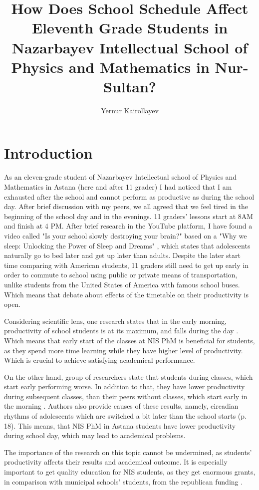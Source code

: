 \documentclass[12pt,a4paper,stu, donotrepeattitle, floatsintext]{apa7}
\title{\large{How Does School Schedule Affect Eleventh Grade Students in Nazarbayev Intellectual School of Physics and Mathematics in Nur-Sultan?}}
\author{Yernur Kairollayev}
\affiliation{Nazarbayev Intellectual School of Physics and Mathematics}
\begin{document}
\maketitle
\section{Introduction}
As an eleven-grade student of Nazarbayev Intellectual school of Physics and Mathematics in Astana (here and after 11 grader) I had noticed that I am exhausted after the school and cannot perform as productive as during the school day. After brief discussion with my peers, we all agreed that we feel tired in the beginning of the school day and in the evenings. 11 graders’ lessons start at 8AM and finish at 4 PM. After brief research in the YouTube platform, I have found a video called "Is your school slowly destroying your brain?" \cite{youtube} based on a "Why we sleep: Unlocking the Power of Sleep and Dreams" \cite{Walker2017}, which states that adolescents naturally go to bed later and get up later than adults. Despite the later start time comparing with American students, 11 graders still need to get up early in order to commute to school using public or private means of transportation, unlike students from the United States of America with famous school buses. Which means that debate about effects of the timetable on their productivity is open.

Considering scientific lens, one research states that in the early morning, productivity of school students is at its maximum, and falls during the day \cite[p. 10]{Pope2016}. Which means that early start of the classes at NIS PhM is beneficial for students, as they spend more time learning while they have higher level of productivity. Which is crucial to achieve satisfying academical performance.

On the other hand, group of researchers state that students during classes, which start early performing worse. In addition to that, they have lower productivity during subsequent classes, than their peers without classes, which start early in the morning \cite{Carell2018}. Authors also provide causes of these results, namely, circadian rhythms of adolescents which are switched a bit later than the school starts (p. 18).  This means, that NIS PhM in Astana students have lower productivity during school day, which may lead to academical problems.

The importance of the research on this topic cannot be undermined, as students’ productivity affects their results and academical outcome. It is especially important to get quality education for NIS students, as they get enormous grants, in comparison with municipal schools’ students, from the republican funding \cite{Massimov_res, zakon_2020}.
\end{document}

